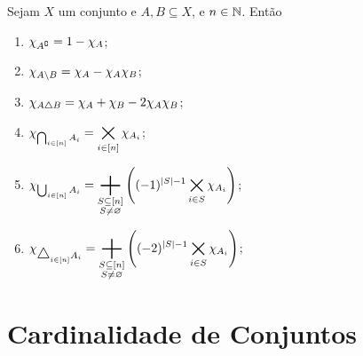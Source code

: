 \begin{prop}
Sejam $X$ um conjunto e $A,B \subseteq X$, e $n \in \mathbb{N}$. Então
	\begin{enumerate}
	\item $\chi_{A^\complement} = 1- \chi_A$;
	\item $\chi_{A \setminus B} = \chi_A-\chi_A\chi_B$;
	\item $\chi_{A \mathbin{\triangle} B} = \chi_A+\chi_B-2\chi_A\chi_B$;
	\item $\displaystyle\chi_{\bigcap_{i \in [n]} A_i} = \bigtimes_{i \in [n]} \chi_{A_i}$;
	\item $\displaystyle\idc_{\bigcup_{i \in [n]} A_i} = \sum_{\substack{S \subseteq [n]\\S \neq \emptyset}} \left((-1)^{\card{S}-1} \bigtimes_{i \in S}\idc_{A_i}\right)$;
	\item $\displaystyle\idc_{\scalebox{1.2}{$\difsim$}_{i \in [n]} A_i} = \sum_{\substack{S \subseteq [n]\\S \neq \emptyset}} \left((-2)^{\card{S}-1} \bigtimes_{i \in S}\idc_{A_i} \right)$;
	\end{enumerate}
\end{prop}
%	



\chapter{Cardinalidade de Conjuntos}

